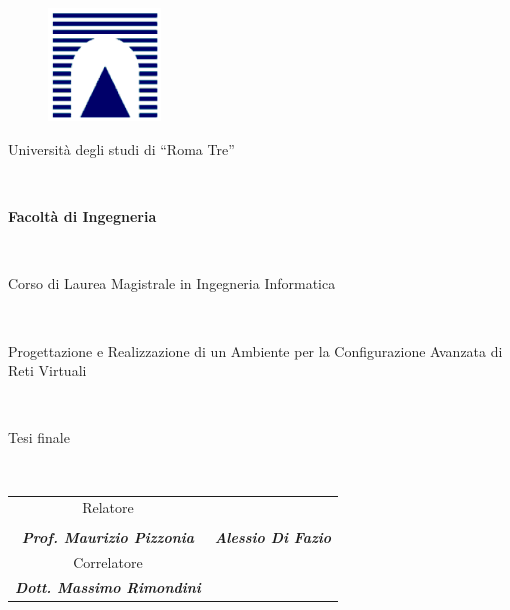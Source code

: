 \begin{figure}[!h]
	\centering
	\includegraphics[width=3cm]{images/logo_uni.png}
\end{figure}
\begin{center}
	\begin{Large}Università degli studi di ``Roma Tre''\end{Large}\\
	\vspace{0.5cm}
	\begin{Large}\textbf{Facoltà di Ingegneria}\end{Large}\\
	\vspace{0.5cm}
	\begin{Large}Corso di Laurea Magistrale in Ingegneria Informatica\end{Large}\\
	\vspace{2cm}
	\begin{huge}Progettazione e Realizzazione di un Ambiente per la Configurazione Avanzata di Reti Virtuali\end{huge}\\
	\vspace{1.5cm}
	\begin{large}Tesi finale\end{large}\\
	\vspace{2cm}	
	\begin{tabular}{cc}
		\begin{minipage}{6.5cm}
			\centering
			Relatore
		\end{minipage}
		&
		\begin{minipage}{6.5cm}
			\centering
			Laureando\\
		\end{minipage}
		\\
		\begin{minipage}{6.5cm}
			\centering
			\vspace{0.4cm}
			\textbf{\textit{Prof. Maurizio Pizzonia}}
		\end{minipage}
		&
		\begin{minipage}{6.5cm}
			\centering
			\textbf{\textit{Alessio Di Fazio}}
		\end{minipage}
		\\
		\begin{minipage}{6.5cm}
			\centering
			\vspace{1cm}
			Correlatore
		\end{minipage}
		\\
		\begin{minipage}{6.5cm}
			\centering
			\vspace{0.4cm}
			\textbf{\textit{Dott. Massimo Rimondini}}
		\end{minipage}
	\end{tabular}


\end{center}
